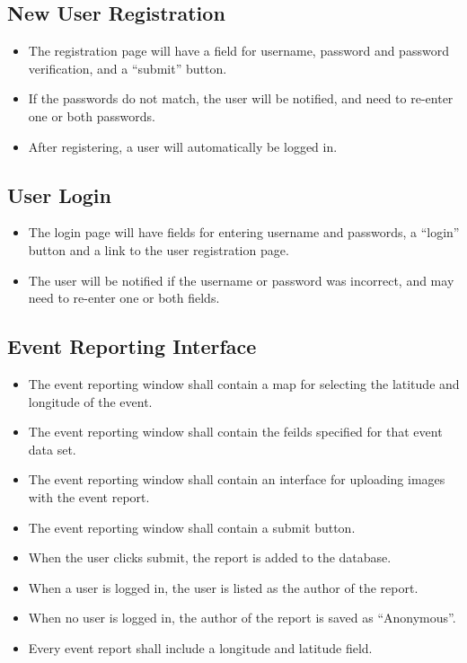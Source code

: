 \subsection{New User Registration}
\begin{itemize}
\item The registration page will have a field for username, password and password verification, and a ``submit'' button.
\item If the passwords do not match, the user will be notified, and need to re-enter one or both passwords.
\item After registering, a user will automatically be logged in.
\end{itemize}

\subsection{User Login}
\begin{itemize}
\item The login page will have fields for entering username and passwords, a ``login'' button and a link to the user registration page.
\item The user will be notified if the username or password was incorrect, and may need to re-enter one or both fields.
\end{itemize}

\subsection{Event Reporting Interface}
\begin{itemize}
\item The event reporting window shall contain a map for selecting the latitude and longitude of the event.
\item The event reporting window shall contain the feilds specified for that event data set.
\item The event reporting window shall contain an interface for uploading images with the event report.
\item The event reporting window shall contain a submit button.
\item When the user clicks submit, the report is added to the database.
\item When a user is logged in, the user is listed as the author of the report.
\item When no user is logged in, the author of the report is saved as ``Anonymous''.
\item Every event report shall include a longitude and latitude field.
\end{itemize}

